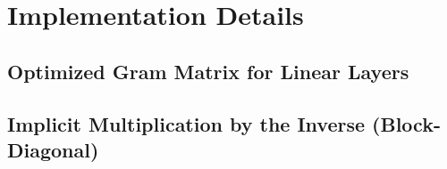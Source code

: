 \section{Implementation Details}\label{vivit::sec:implementation-details}


\subsection{Optimized Gram Matrix for Linear
  Layers}\label{vivit::sec:optimized-gram-matrix}


\subsection{Implicit Multiplication by the Inverse (Block-Diagonal)
  \ggn}\label{vivit::sec:implicit-multiplication-inverse}


